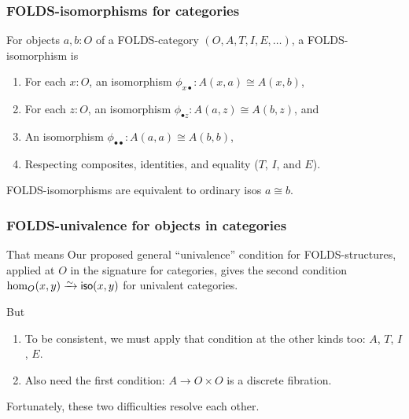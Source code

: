 \documentclass{beamer}
\begin{document}
\begin{frame}[t]
  \frametitle{FOLDS-isomorphisms for categories}
  \begin{example}
    For objects $a,b:O$ of a FOLDS-category $(O,A,T,I,E,\dots)$, a FOLDS-isomorphism is
    \begin{enumerate}
    \item For each $x:O$, an isomorphism $\phi_{x\bullet} : A(x,a) \cong A(x,b)$,
    \item For each $z:O$, an isomorphism $\phi_{\bullet z} : A(a,z) \cong A(b,z)$, and
    \item An isomorphism $\phi_{\bullet\bullet} : A(a,a) \cong A(b,b)$,
    \item Respecting composites, identities, and equality ($T$, $I$, and $E$).
    \end{enumerate}
  \end{example}
  \begin{theorem}
    FOLDS-isomorphisms are equivalent to ordinary isos $a\cong b$.
  \end{theorem}
\end{frame}

\begin{frame}
  \frametitle{FOLDS-univalence for objects in categories}
  \begin{block}{That means}
    Our proposed general ``univalence'' condition for FOLDS-structures, applied at $O$ in the signature for categories, gives the second condition $\hom_O(x,y) \toiso \mathsf{iso}(x,y)$ for univalent categories.
  \end{block}
  \begin{block}{But}
    \begin{enumerate}
    \item To be consistent, we must apply that condition at the other kinds too: $A$, $T$, $I$, $E$.
    \item Also need the first condition: $A\to O\times O$ is a discrete fibration.
    \end{enumerate}
  \end{block}
  Fortunately, these two difficulties resolve each other.
\end{frame}
\end{document}
